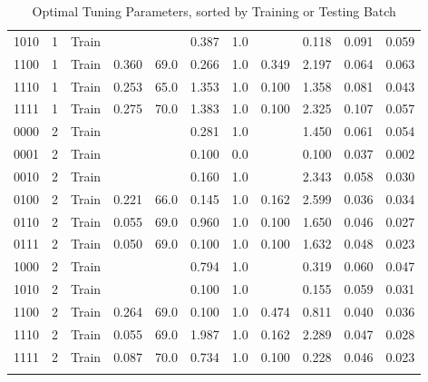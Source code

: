 \begin{longtable}{lllrrrrrrrr}
   1010 &       1 &   Train &       &     &     0.387 & 1.0 &    &          0.118 & 0.091 & 0.059 \\
   1100 &       1 &   Train &    0.360 & 69.0 &     0.266 & 1.0 & 0.349 &          2.197 & 0.064 & 0.063 \\
   1110 &       1 &   Train &    0.253 & 65.0 &     1.353 & 1.0 & 0.100 &          1.358 & 0.081 & 0.043 \\
   1111 &       1 &   Train &    0.275 & 70.0 &     1.383 & 1.0 & 0.100 &          2.325 & 0.107 & 0.057 \\
   0000 &       2 &   Train &       &     &     0.281 & 1.0 &    &          1.450 & 0.061 & 0.054 \\
   0001 &       2 &   Train &       &     &     0.100 & 0.0 &    &          0.100 & 0.037 & 0.002 \\
   0010 &       2 &   Train &       &     &     0.160 & 1.0 &    &          2.343 & 0.058 & 0.030 \\
   0100 &       2 &   Train &    0.221 & 66.0 &     0.145 & 1.0 & 0.162 &          2.599 & 0.036 & 0.034 \\
   0110 &       2 &   Train &    0.055 & 69.0 &     0.960 & 1.0 & 0.100 &          1.650 & 0.046 & 0.027 \\
   0111 &       2 &   Train &    0.050 & 69.0 &     0.100 & 1.0 & 0.100 &          1.632 & 0.048 & 0.023 \\
   1000 &       2 &   Train &       &     &     0.794 & 1.0 &    &          0.319 & 0.060 & 0.047 \\
   1010 &       2 &   Train &       &     &     0.100 & 1.0 &    &          0.155 & 0.059 & 0.031 \\
   1100 &       2 &   Train &    0.264 & 69.0 &     0.100 & 1.0 & 0.474 &          0.811 & 0.040 & 0.036 \\
   1110 &       2 &   Train &    0.055 & 69.0 &     1.987 & 1.0 & 0.162 &          2.289 & 0.047 & 0.028 \\
   1111 &       2 &   Train &    0.087 & 70.0 &     0.734 & 1.0 & 0.100 &          0.228 & 0.046 & 0.023 \\
\caption{Optimal Tuning Parameters, sorted by Training or Testing Batch}
\end{longtable}
\endgroup


\begingroup
\setlength{\LTleft}{-20cm plus -1fill}
\setlength{\LTright}{\LTleft}

